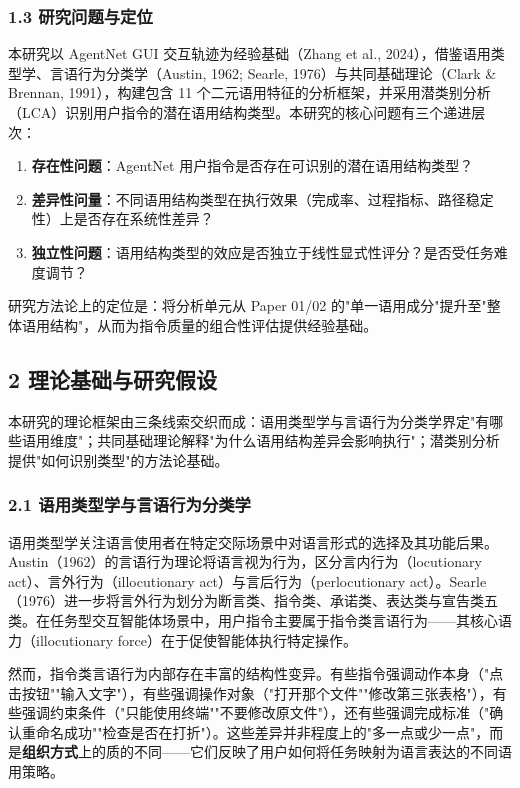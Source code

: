 \documentclass[12pt,a4paper,openany,oneside]{ctexrep}
\begin{document}
\subsubsection{1.3 研究问题与定位}


本研究以 AgentNet GUI 交互轨迹为经验基础（Zhang et al., 2024），借鉴语用类型学、言语行为分类学（Austin, 1962; Searle, 1976）与共同基础理论（Clark \& Brennan, 1991），构建包含 11 个二元语用特征的分析框架，并采用潜类别分析（LCA）识别用户指令的潜在语用结构类型。本研究的核心问题有三个递进层次：

\begin{enumerate}
\item[1.] \textbf{存在性问题}：AgentNet 用户指令是否存在可识别的潜在语用结构类型？
\item[2.] \textbf{差异性问量}：不同语用结构类型在执行效果（完成率、过程指标、路径稳定性）上是否存在系统性差异？
\item[3.] \textbf{独立性问题}：语用结构类型的效应是否独立于线性显式性评分？是否受任务难度调节？
\end{enumerate}


研究方法论上的定位是：将分析单元从 Paper 01/02 的"单一语用成分"提升至"整体语用结构"，从而为指令质量的组合性评估提供经验基础。

\subsection{2 理论基础与研究假设}


本研究的理论框架由三条线索交织而成：语用类型学与言语行为分类学界定"有哪些语用维度"；共同基础理论解释"为什么语用结构差异会影响执行"；潜类别分析提供"如何识别类型"的方法论基础。

\subsubsection{2.1 语用类型学与言语行为分类学}


语用类型学关注语言使用者在特定交际场景中对语言形式的选择及其功能后果。Austin（1962）的言语行为理论将语言视为行为，区分言内行为（locutionary act）、言外行为（illocutionary act）与言后行为（perlocutionary act）。Searle（1976）进一步将言外行为划分为断言类、指令类、承诺类、表达类与宣告类五类。在任务型交互智能体场景中，用户指令主要属于指令类言语行为——其核心语力（illocutionary force）在于促使智能体执行特定操作。

然而，指令类言语行为内部存在丰富的结构性变异。有些指令强调动作本身（"点击按钮""输入文字"），有些强调操作对象（"打开那个文件""修改第三张表格"），有些强调约束条件（"只能使用终端""不要修改原文件"），还有些强调完成标准（"确认重命名成功""检查是否在打折"）。这些差异并非程度上的"多一点或少一点"，而是\textbf{组织方式}上的质的不同——它们反映了用户如何将任务映射为语言表达的不同语用策略。
\end{document}
